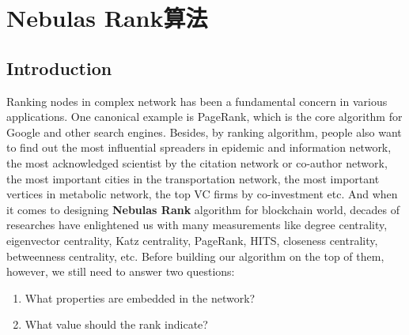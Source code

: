 \section{Nebulas Rank算法}
\label{sec:nrrank}


\subsection{Introduction} \label{sec:intro}
Ranking nodes in complex network has been a fundamental concern in various applications. One canonical example is PageRank\cite{Brin2010}\cite{page1999pagerank}, which is the core algorithm for Google and other search engines\cite{langville2011google}. Besides, by ranking algorithm, people also want to find out the most influential spreaders in epidemic and information network\cite{doerr2012rumors}\cite{Kitsak2010}, the most acknowledged scientist by the citation network or co-author network\cite{walker2007ranking}\cite{chen2007finding}\cite{Radicchi2009}, the most important cities in the transportation network\cite{guimera2005worldwide}, the most important vertices in metabolic network\cite{ivan2010web}, the top VC firms by co-investment\cite{Bhat2012} etc. And when it comes to designing \textbf{Nebulas Rank} algorithm for blockchain world, decades of researches have enlightened us with many measurements like degree centrality\cite{freeman1979set}, eigenvector centrality\cite{bonacich1972factoring}, Katz centrality\cite{katz1953new}, PageRank\cite{Brin2010}, HITS\cite{kleinberg1999authoritative}, closeness centrality\cite{sabidussi1966centrality}, betweenness centrality\cite{freeman1977set}\cite{freeman1978centrality}\cite{freeman1991centrality}\cite{noh2004random}\cite{newman2005measure}, etc. Before building our algorithm on the top of them, however, we still need to answer two questions:
\begin{enumerate}
\item What properties are embedded in the network?
\item What value should the rank indicate?
\end{enumerate}
